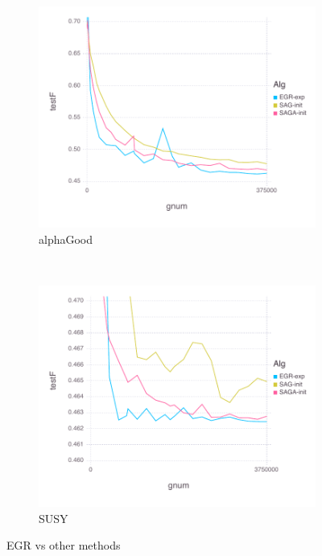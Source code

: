 \documentclass[11pt]{article}
\begin{document}
\begin{figure}[H]
       \begin{subfigure}[b]{0.45\textwidth}
           \includegraphics[width=\textwidth]{Figures/alphaGoodBLtrueFfFinal-g.pdf}
           \caption{alphaGood}
       \end{subfigure}
       ~ %
         \begin{subfigure}[b]{0.45\textwidth}
           \includegraphics[width=\textwidth]{Figures/SUSYBLtrueFfFinal-g.pdf}
             \caption{SUSY}
         \end{subfigure}
       \caption{EGR vs other methods}\label{fig:alphaGoodom}
   \end{figure}
   
\end{document}
